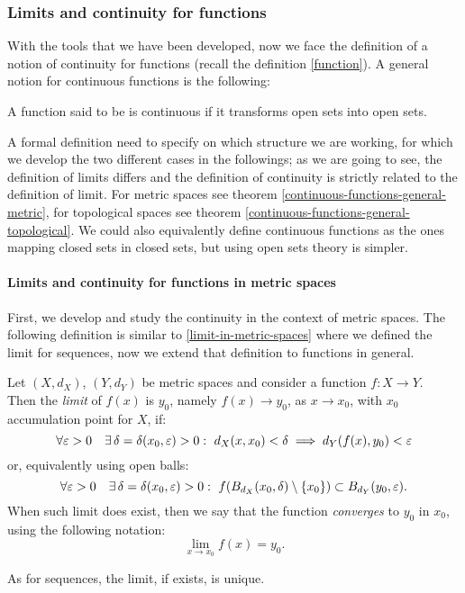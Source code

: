 \subsubsection{Limits and continuity for functions}
With the tools that we have been developed, now we face the definition of a notion of continuity for functions (recall the definition \vref{function}). A general notion for continuous functions is the following:
\begin{defn}\label{continuous-functions-general}
	A function said to be is continuous if it transforms open sets into open sets.
\end{defn} 
A formal definition need to specify on which structure we are working, for which we develop the two different cases in the followings; as we are going to see, the definition of limits differs and the definition of continuity is strictly related to the definition of limit. For metric spaces see theorem \vref{continuous-functions-general-metric}, for topological spaces see theorem \vref{continuous-functions-general-topological}.
We could also equivalently define continuous functions as the ones mapping closed sets in closed sets, but using open sets theory is simpler.

\paragraph{Limits and continuity for functions in metric spaces}
First, we develop and study the continuity in the context of metric spaces. The following definition is similar to \vref{limit-in-metric-spaces} where we defined the limit for sequences, now we extend that definition to functions in general.
\begin{defn} \label{limit-function-in-metric-spaces}
	Let $(X, d_X)$, $(Y, d_Y)$ be metric spaces and consider a function $f: X \to Y$.\\
	Then the \emph{limit} of $f(x)$ is $y_0$, namely $f(x) \to y_0$, as $x \to x_0$, with $x_0$ accumulation point for $X$, if:
	$$
		\forall \varepsilon > 0 \quad \exists \, \delta = \delta(x_0, \varepsilon) > 0: \ d_X(x, x_0) < \delta \implies d_Y(f(x), y_0) < \varepsilon$$
	or, equivalently using open balls:
	$$\forall \varepsilon > 0 \quad \exists \, \delta = \delta(x_0, \varepsilon) > 0: \ f(B_{d_X}(x_0, \delta) \setminus \{x_0\})\subset B_{d_Y}(y_0, \varepsilon).$$
	When such limit does exist, then we say that the function \emph{converges} to $y_0$ in $x_0$, using the following notation:
	$$ \lim\limits_{x \to x_0}f(x)=y_0.$$
\end{defn}
As for sequences, the limit, if exists, is unique.

